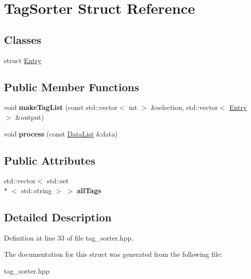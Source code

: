 \hypertarget{struct_tag_sorter}{\section{Tag\-Sorter Struct Reference}
\label{struct_tag_sorter}
}
\subsection*{Classes}
\begin{DoxyCompactItemize}
\item 
struct \hyperlink{struct_tag_sorter_1_1_entry}{Entry}
\end{DoxyCompactItemize}
\subsection*{Public Member Functions}
\begin{DoxyCompactItemize}
\item 
\hypertarget{struct_tag_sorter_a85d9bb52fa8c1b7864883ae9ef0c240a}{void {\bfseries make\-Tag\-List} (const std\-::vector$<$ int $>$ \&selection, std\-::vector$<$ \hyperlink{struct_tag_sorter_1_1_entry}{Entry} $>$ \&output)}\label{struct_tag_sorter_a85d9bb52fa8c1b7864883ae9ef0c240a}

\item 
\hypertarget{struct_tag_sorter_a9042c82ca3bd3264c699159b43f25851}{void {\bfseries process} (const \hyperlink{struct_data_list}{Data\-List} \&data)}\label{struct_tag_sorter_a9042c82ca3bd3264c699159b43f25851}

\end{DoxyCompactItemize}
\subsection*{Public Attributes}
\begin{DoxyCompactItemize}
\item 
\hypertarget{struct_tag_sorter_a78d113d99b9e79aa1dd8cdd378226273}{std\-::vector$<$ std\-::set\\*
$<$ std\-::string $>$ $>$ {\bfseries all\-Tags}}\label{struct_tag_sorter_a78d113d99b9e79aa1dd8cdd378226273}

\end{DoxyCompactItemize}


\subsection{Detailed Description}


Definition at line 33 of file tag\-\_\-sorter.\-hpp.



The documentation for this struct was generated from the following file\-:\begin{DoxyCompactItemize}
\item 
tag\-\_\-sorter.\-hpp\end{DoxyCompactItemize}
